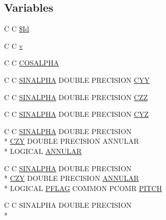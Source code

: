 \subsection*{Variables}
\begin{DoxyCompactItemize}
\item 
C C \hyperlink{periodic_8com_af40bd3a96fc1553c00422342f92046b8}{\$\-Id}
\item 
C C \hyperlink{periodic_8com_a8961853e9a171af64fe80e35da93a2e0}{v}
\item 
C C \hyperlink{periodic_8com_a4b15991d4fb7de518675fda13598d7ff}{C\-O\-S\-A\-L\-P\-H\-A}
\item 
C C \hyperlink{periodic_8com_a76d1a34bb91d6b27600fc2c1bc9b26fd}{S\-I\-N\-A\-L\-P\-H\-A} D\-O\-U\-B\-L\-E P\-R\-E\-C\-I\-S\-I\-O\-N \hyperlink{periodic_8com_a39400ffeeb9beb4a0d25143093c58fca}{C\-Y\-Y}
\item 
C C \hyperlink{periodic_8com_a76d1a34bb91d6b27600fc2c1bc9b26fd}{S\-I\-N\-A\-L\-P\-H\-A} D\-O\-U\-B\-L\-E P\-R\-E\-C\-I\-S\-I\-O\-N \hyperlink{periodic_8com_aa7bcfd7f2b578501797a2b6dd051182c}{C\-Z\-Z}
\item 
C C \hyperlink{periodic_8com_a76d1a34bb91d6b27600fc2c1bc9b26fd}{S\-I\-N\-A\-L\-P\-H\-A} D\-O\-U\-B\-L\-E P\-R\-E\-C\-I\-S\-I\-O\-N \hyperlink{periodic_8com_a6598de5f1ee82a5816b02138d3b68272}{C\-Y\-Z}
\item 
C C \hyperlink{periodic_8com_a76d1a34bb91d6b27600fc2c1bc9b26fd}{S\-I\-N\-A\-L\-P\-H\-A} D\-O\-U\-B\-L\-E P\-R\-E\-C\-I\-S\-I\-O\-N \\*
\hyperlink{periodic_8com_adb297821c3d32421de02ebdcccf54496}{C\-Z\-Y} D\-O\-U\-B\-L\-E P\-R\-E\-C\-I\-S\-I\-O\-N A\-N\-N\-U\-L\-A\-R \\*
L\-O\-G\-I\-C\-A\-L \hyperlink{periodic_8com_a4d79b405c5ac65e6460b47e6dd1f4ac4}{A\-N\-N\-U\-L\-A\-R}
\item 
C C \hyperlink{periodic_8com_a76d1a34bb91d6b27600fc2c1bc9b26fd}{S\-I\-N\-A\-L\-P\-H\-A} D\-O\-U\-B\-L\-E P\-R\-E\-C\-I\-S\-I\-O\-N \\*
\hyperlink{periodic_8com_adb297821c3d32421de02ebdcccf54496}{C\-Z\-Y} D\-O\-U\-B\-L\-E P\-R\-E\-C\-I\-S\-I\-O\-N \hyperlink{periodic_8com_a4d79b405c5ac65e6460b47e6dd1f4ac4}{A\-N\-N\-U\-L\-A\-R} \\*
L\-O\-G\-I\-C\-A\-L \hyperlink{periodic_8com_a52cabf2f682fb4b41d02b41bd40dbea3}{P\-F\-L\-A\-G} C\-O\-M\-M\-O\-N P\-C\-O\-M\-R \hyperlink{periodic_8com_a561a55de399868c8c1a3a96eb4417f38}{P\-I\-T\-C\-H}
\item 
C C S\-I\-N\-A\-L\-P\-H\-A D\-O\-U\-B\-L\-E P\-R\-E\-C\-I\-S\-I\-O\-N \\*

\end{DoxyCompactItemize}
